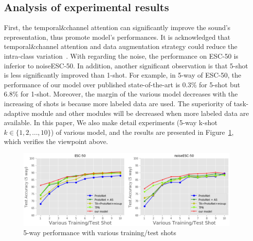 \documentclass[a4paper]{article}
\begin{document}
\subsection{Analysis of experimental results}
\vspace{-1mm}
First, the temporal\&channel attention can significantly improve the sound's representation, thus promote model's performances. It is acknowledged that
temporal\&channel attention and data augmentation strategy could reduce the intra-class variation~\cite{dataaug}.
With regarding the noise, the performance on ESC-50 is inferior to noiseESC-50. 
In addition, another significant observation is that 5-shot is less significantly improved than 1-shot.
For example, in 5-way of ESC-50, the performance of our model over published state-of-the-art is 0.3\% for 5-shot but 6.8\% for 1-shot. 
Moreover, the margin of the various model decreases with the increasing of shots is because more labeled data are used. The superiority of task-adaptive module and other modules will be decreased when more labeled data are available. 
In this paper, We also make detail experiments (5-way k-shot $k \in \{1,2,...,10\}$) of various model, and the results are presented in Figure~\ref{fig:fig_exp_1}, which verifies the viewpoint above.
\vspace{-2mm}
\begin{figure}[t]
	\centering
	\includegraphics[width=\linewidth]{./pic/exp_8.png}
	\caption{5-way performance with various training/test shots}
	\label{fig:fig_exp_1}
	\vspace{-3mm}
\end{figure}
\end{document}
